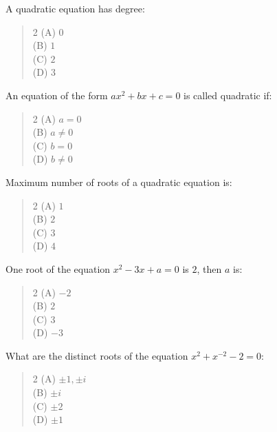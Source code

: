 \documentclass[11pt,a4paper]{article}
\begin{document}
\begin{mcqlist}
\item A quadratic equation has degree:
\begin{quote}\begin{multicols}{2}
\noindent (A) $0$ \\
(B) $1$ \\
(C) $2$ \\
(D) $3$
\end{multicols}\end{quote}

\item An equation of the form $ax^2+bx+c=0$ is called quadratic if:
\begin{quote}\begin{multicols}{2}
\noindent (A) $a=0$ \\
(B) $a\neq0$ \\
(C) $b=0$ \\
(D) $b\neq0$
\end{multicols}\end{quote}

\item Maximum number of roots of a quadratic equation is:
\begin{quote}\begin{multicols}{2}
\noindent (A) $1$ \\
(B) $2$ \\
(C) $3$ \\
(D) $4$
\end{multicols}\end{quote}

\item One root of the equation $x^2-3x+a=0$ is $2$, then $a$ is:
\begin{quote}\begin{multicols}{2}
\noindent (A) $-2$ \\
(B) $2$ \\
(C) $3$ \\
(D) $-3$
\end{multicols}\end{quote}

\item What are the distinct roots of the equation $x^2+x^{-2}-2=0$:
\begin{quote}\begin{multicols}{2}
\noindent (A) $\pm1,\pm i$ \\
(B) $\pm i$ \\
(C) $\pm2$ \\
(D) $\pm1$
\end{multicols}\end{quote}


\end{mcqlist}
\end{document}
